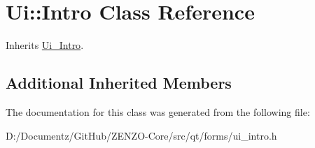 \hypertarget{class_ui_1_1_intro}{}\section{Ui\+::Intro Class Reference}
\label{class_ui_1_1_intro}


Inherits \mbox{\hyperlink{class_ui___intro}{Ui\+\_\+\+Intro}}.

\subsection*{Additional Inherited Members}


The documentation for this class was generated from the following file\+:\begin{DoxyCompactItemize}
\item 
D\+:/\+Documentz/\+Git\+Hub/\+Z\+E\+N\+Z\+O-\/\+Core/src/qt/forms/ui\+\_\+intro.\+h\end{DoxyCompactItemize}
